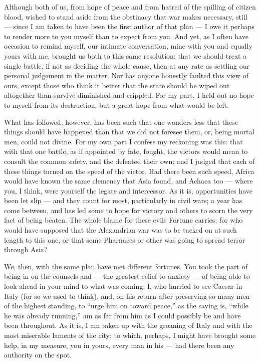 

 Although both of us, from hope of peace and from hatred of the spilling of citizen blood, wished to stand aside from the obstinacy that war makes necessary, still --- since I am taken to have been the first author of that plan --- I owe it perhaps to render more to you myself than to expect from you. And yet, as I often have occasion to remind myself, our intimate conversation, mine with you and equally yours with me, brought us both to this same resolution: that we should treat a single battle, if not as deciding the whole cause, then at any rate as settling our personal judgement in the matter. Nor has anyone honestly faulted this view of ours, except those who think it better that the state should be wiped out altogether than survive diminished and crippled. For my part, I held out no hope to myself from its destruction, but a great hope from what would be left.

 What has followed, however, has been such that one wonders less that these things should have happened than that we did not foresee them, or, being mortal men, could not divine. For my own part I confess my reckoning was this: that with that one battle, as if appointed by fate, fought, the victors would mean to consult the common safety, and the defeated their own; and I judged that each of these things turned on the speed of the victor. Had there been such speed, Africa would have known the same clemency that Asia found, and Achaea too --- where you, I think, were yourself the legate and intercessor. As it is, opportunities have been let slip --- and they count for most, particularly in civil wars; a year has come between, and has led some to hope for victory and others to scorn the very fact of being beaten. The whole blame for these evils Fortune carries; for who would have supposed that the Alexandrian war was to be tacked on at such length to this one, or that some Pharnaces or other was going to spread terror through Asia?

 We, then, with the same plan have met different fortunes. You took the part of being in on the counsels and --- the greatest relief to anxiety --- of being able to look ahead in your mind to what was coming; I, who hurried to see Caesar in Italy (for so we used to think), and, on his return after preserving so many men of the highest standing, to ``urge him on toward peace,'' as the saying is, ``while he was already running,'' am as far from him as I could possibly be and have been throughout. As it is, I am taken up with the groaning of Italy and with the most miserable laments of the city; to which, perhaps, I might have brought some help, in my measure, you in yours, every man in his --- had there been any authority on the spot.


